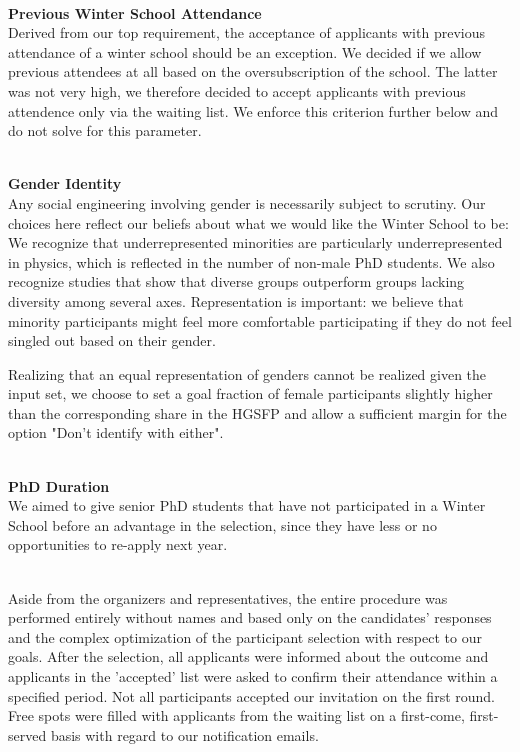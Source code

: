 ~\\
\textbf{Previous Winter School Attendance}\\
Derived from our top requirement, the acceptance of applicants with previous attendance of a winter school should be an exception. We decided if we allow previous attendees at all based on the oversubscription of the school. The latter was not very high, we therefore decided to accept applicants with previous attendence only via the waiting list. We enforce this criterion further below and do not solve for this parameter.

~\\
\textbf{Gender Identity}\\
Any social engineering involving gender is necessarily subject to scrutiny. Our choices here reflect our beliefs about what we would like the Winter School to be: We recognize that underrepresented minorities are particularly underrepresented in physics, which is reflected in the number of non-male PhD students. We also recognize studies that show that diverse groups outperform groups lacking diversity among several axes. Representation is important: we believe that minority participants might feel more comfortable participating if they do not feel singled out based on their gender.

Realizing that an equal representation of genders cannot be realized given the input set, we choose to set a goal fraction of female participants slightly higher than the corresponding share in the HGSFP and allow a sufficient margin for the option "Don't identify with either".

~\\
\textbf{PhD Duration}\\
We aimed to give senior PhD students that have not participated in a Winter School before an advantage in the selection, since they have less or no opportunities to re-apply next year.

~\\
Aside from the organizers and representatives, the entire procedure was performed entirely without names and based only on the candidates' responses and the complex optimization of the participant selection with respect to our goals. After the selection, all applicants were informed about the outcome and applicants in the 'accepted' list were asked to confirm their attendance within a specified period. Not all participants accepted our invitation on the first round. Free spots were filled with applicants from the waiting list on a first-come, first-served basis with regard to our notification emails. 

